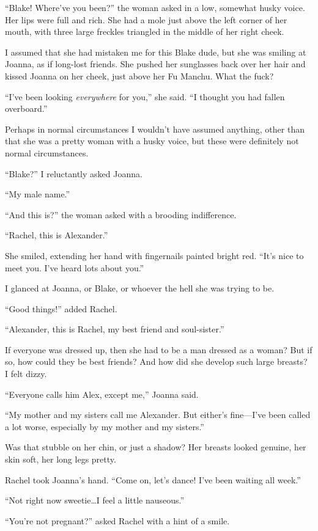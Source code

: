 ``Blake! Where've you been?'' the woman asked in a low, somewhat husky
voice. Her lips were full and rich. She had a mole just above the left
corner of her mouth, with three large freckles triangled in the middle
of her right cheek.

I assumed that she had mistaken me for this Blake dude, but she was
smiling at Joanna, as if long-lost friends. She pushed her sunglasses
back over her hair and kissed Joanna on her cheek, just above her Fu
Manchu. What the fuck?

``I've been looking \emph{everywhere} for you,'' she said. ``I thought
you had fallen overboard.''

Perhaps in normal circumstances I wouldn't have assumed anything, other
than that she was a pretty woman with a husky voice, but these were
definitely not normal circumstances.

``Blake?'' I reluctantly asked Joanna.

``My male name.''

``And this is?'' the woman asked with a brooding indifference.

``Rachel, this is Alexander.''

She smiled, extending her hand with fingernails painted bright red.
``It's nice to meet you. I've heard lots about you.''

I glanced at Joanna, or Blake, or whoever the hell she was trying to be.

``Good things!'' added Rachel.

``Alexander, this is Rachel, my best friend and soul-sister.''

If everyone was dressed up, then she had to be a man dressed as a woman?
But if so, how could they be best friends? And how did she develop such
large breasts? I felt dizzy.

``Everyone calls him Alex, except me,'' Joanna said.

``My mother and my sisters call me Alexander. But either's fine---I've
been called a lot worse, especially by my mother and my sisters.''

Was that stubble on her chin, or just a shadow? Her breasts looked
genuine, her skin soft, her long legs pretty.

Rachel took Joanna's hand. ``Come on, let's dance! I've been waiting all
week.''

``Not right now sweetie\ldots I feel a little nauseous.''

``You're not pregnant?'' asked Rachel with a hint of a smile.

